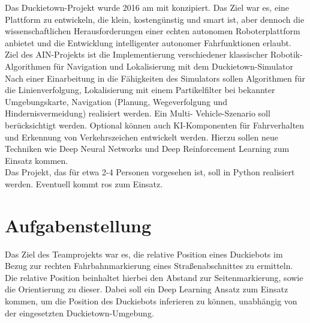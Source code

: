 Das Duckietown-Projekt wurde 2016 am \acf{mit} konzipiert. Das Ziel war es, eine Plattform zu
entwickeln, die klein, kostengünstig und \grqq smart\grqq{} ist, aber dennoch die wissenschaftlichen
Herausforderungen einer echten autonomen Roboterplattform anbietet und die Entwicklung
intelligenter autonomer Fahrfunktionen erlaubt. \cite{duckietown}\\

\noindent Ziel des AIN-Projekts ist die Implementierung verschiedener klassischer Robotik-Algorithmen
für Navigation und Lokalisierung mit dem Duckietown-Simulator\\

\noindent Nach einer Einarbeitung in die Fähigkeiten des Simulators sollen Algorithmen für die
Linienverfolgung, Lokalisierung mit einem Partikelfilter bei bekannter Umgebungskarte,
Navigation (Planung, Wegeverfolgung und Hindernisvermeidung) realisiert werden. Ein Multi-
Vehicle-Szenario soll berücksichtigt werden. Optional können auch KI-Komponenten für
Fahrverhalten und Erkennung von Verkehrszeichen entwickelt werden. Hierzu sollen neue
Techniken wie Deep Neural Networks und Deep Reinforcement Learning zum Einsatz
kommen.\\

\noindent Das Projekt, das für etwa 2-4 Personen vorgesehen ist, soll in Python realisiert werden.
Eventuell kommt \acf{ros} zum Einsatz.

\newpage

\section{Aufgabenstellung}

Das Ziel des Teamprojekts war es, die relative Position eines Duckiebots im Bezug zur rechten Fahrbahnmarkierung eines Straßenabschnittes zu ermitteln. Die relative Position beinhaltet hierbei den Abstand zur Seitenmarkierung, sowie die Orientierung zu dieser. Dabei soll ein Deep Learning Ansatz zum Einsatz kommen, um die Position des Duckiebots inferieren zu können, unabhängig von der eingesetzten Duckietown-Umgebung. 